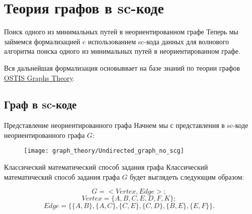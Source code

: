 % 
% 
%
% 
% 

\section{Теория графов в sc-коде}

\begin{frame}{Поиск одного из минимальных путей в неориентированном графе}
  Теперь мы займемся формализацией c использованием sc-кода данных для
  волнового алгоритма поиска одного из минимальных путей в
  неориентированном графе.

  Вся дальнейшая формализация основыввает на базе знаний по теории
  графов
  \href{http://ostisgraphstheo.sourceforge.net/index.php/Заглавная_страница}{OSTIS Graphs Theory}.
\end{frame}

\subsection{Граф в sc-коде}

\begin{frame}{Представление неориентированного графа}
  Начнем мы с представления в sc-коде неориентированного графа $G$:

  \begin{figure}
    \centering
    \texttt{[image: graph\_theory/Undirected\_graph\_no\_scg]}
  \end{figure}
\end{frame}

\begin{frame}{Классический математический способ задания графа}
  Классический математический способ задания графа $G$ будет выглядеть
  следующим образом:
  
  \[ G = <Vertex, Edge>; \]
  \[ Vertex = \{ A, B, C, E, D, F, K \}; \]
  \[ Edge = \{ \{A, B\}, \{A, C\}, \{C, E\}, \{C, D\}, \{B, E\}, \{E, F\} \}. \]
\end{frame}

